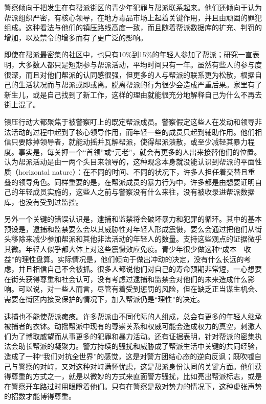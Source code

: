 \documentclass[fontset=fandol, a4paper, 12pt, openright]{ctexbook}
\begin{document}
警察倾向于把发生在有帮派街区的青少年犯罪与帮派联系起来。他们还倾向于认为帮派组织严密，有核心领导，在地方毒品市场上起着关键作用，并且由顽固的罪犯组成。这种看法与他们的镇压路线高度一致，而且随着帮派数据库的扩充、判罚的增加，以及禁令的增多而有了更广泛的影响。



即使在帮派最密集的社区中，也只有10\%到15\%的年轻人参加了帮派；研究一直表明，大多数人都只是短期参与帮派活动，平均时间只有一年。虽然有些人的参与度很深，而且对他们帮派的认同感很强，但更多的人与帮派的联系更为松散，根据自己的生活状况而与帮派或即或离。脱离帮派的行为很少会造成严重后果。家里有了新生儿，或是自己找到了新工作，这样的理由就能很充分地解释自己为什么不再去街上混了。

镇压行动大都聚焦于被警察盯上的既定帮派成员。警察假定这些人在发动和领导非法活动的过程中起到了核心领导作用，而年轻一些的成员只起到辅助作用。他们相信只要除掉领导者，就能动摇并瓦解帮派，使得帮派溃散，或至少减轻其暴力程度。事实是，每关押一个“首领”或“元老”，就会有更多的人出来接替他们的位置。认为帮派活动是由一两个头目来领导的，这种观念本身就没能认识到帮派的平面性质（horizontal nature）：在不同的时间、不同的状况下，许多人担任着交替且重叠的领导角色。同样重要的是，在帮派成员的暴力行为中，许多都是由想要证明自己的年轻成员实施的，这些人之前与警察没有什么来往，没有被收录进帮派数据库，也没有受到过监控。

另外一个关键的错误认识是，逮捕和监禁将会破坏暴力和犯罪的循环。其中的基本预设是，逮捕和监禁要么会以其威胁性对年轻人形成震慑，要么会通过把他们从街头移除来减少参加帮派和其他非法活动的年轻人的数量。支持这些观点的证据微乎其微。年轻人似乎都大体上对这些震慑效应免疫。青少年很少做这种“成本—收益”的理性盘算。实际情况是，他们倾向于做出冲动的决定，没有什么长远的考虑，并且相信自己不会被抓。很多人都说他们对自己的寿命预期非常短，一心想要在街头获得尊重和社会认可，没有考虑过逮捕和监禁会对他们的未来造成什么影响。可以说，对一些人而言，尽管有着受到惩罚的风险，但在缺乏正当谋生机会、需要在街区内接受保护的情况下，加入帮派仍是“理性”的决定。

逮捕也不能使帮派瘫痪。许多帮派由不同代际的人组成，总会有更多的年轻人继承被捕者的衣钵。动摇帮派中现有的尊崇关系和权威可能会造成权力的真空，刺激人们为了博取威望而从事更多的犯罪和暴力活动。还有证据表明，针对帮派的密集执法会助长帮派的凝聚力。警方持续的骚扰和威胁成了帮派生活中关键的共同经验，造成了一种“我们对抗全世界”的感觉，这是对警方团结心态的逆向反讽；既吹嘘自己与警察的对峙，又对这种对峙满怀忧虑，这是帮派身份认同的关键方面。他们获得尊重的方式之一，就是以微妙的方式来直面警方骚扰，比如亮出帮派标志，或是在警察开车路过时用眼瞪着他们。只有在警察是敌对势力的情况下，这种虚张声势的招数才能博得尊重。
\end{document}
